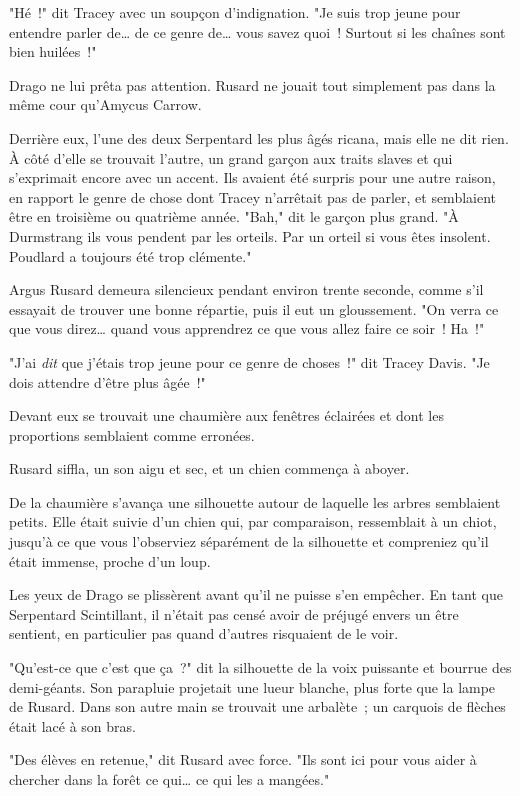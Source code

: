 "Hé~!" dit Tracey avec un soupçon d'indignation. "Je suis trop jeune pour entendre parler de… de ce genre de… vous savez quoi~! Surtout si les chaînes sont bien huilées~!"

Drago ne lui prêta pas attention. Rusard ne jouait tout simplement pas dans la même cour qu'Amycus Carrow.

Derrière eux, l'une des deux Serpentard les plus âgés ricana, mais elle ne dit rien. À côté d'elle se trouvait l'autre, un grand garçon aux traits slaves et qui s'exprimait encore avec un accent. Ils avaient été surpris pour une autre raison, en rapport le genre de chose dont Tracey n'arrêtait pas de parler, et semblaient être en troisième ou quatrième année. "Bah," dit le garçon plus grand. "À Durmstrang ils vous pendent par les orteils. Par un orteil si vous êtes insolent. Poudlard a toujours été trop clémente."

Argus Rusard demeura silencieux pendant environ trente seconde, comme s'il essayait de trouver une bonne répartie, puis il eut un gloussement. "On verra ce que vous direz… quand vous apprendrez ce que vous allez faire ce soir~! Ha~!"

"J'ai \emph{dit} que j'étais trop jeune pour ce genre de choses~!" dit Tracey Davis. "Je dois attendre d'être plus âgée~!"

Devant eux se trouvait une chaumière aux fenêtres éclairées et dont les proportions semblaient comme erronées.

Rusard siffla, un son aigu et sec, et un chien commença à aboyer.

De la chaumière s'avança une silhouette autour de laquelle les arbres semblaient petits. Elle était suivie d'un chien qui, par comparaison, ressemblait à un chiot, jusqu'à ce que vous l'observiez séparément de la silhouette et compreniez qu'il était immense, proche d'un loup.

Les yeux de Drago se plissèrent avant qu'il ne puisse s'en empêcher. En tant que Serpentard Scintillant, il n'était pas censé avoir de préjugé envers un être sentient, en particulier pas quand d'autres risquaient de le voir.

"Qu'est-ce que c'est que ça~?" dit la silhouette de la voix puissante et bourrue des demi-géants. Son parapluie projetait une lueur blanche, plus forte que la lampe de Rusard. Dans son autre main se trouvait une arbalète~; un carquois de flèches était lacé à son bras.

"Des élèves en retenue," dit Rusard avec force. "Ils sont ici pour vous aider à chercher dans la forêt ce qui… ce qui les a mangées."

